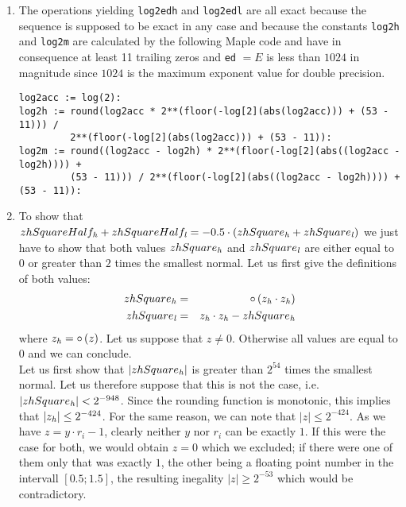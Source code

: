 \begin{enumerate}
\item The operations yielding {\tt log2edh} and {\tt log2edl} are all exact because the \Add~ sequence is supposed 
to be exact in any case and because the constants {\tt log2h} and {\tt log2m} are calculated by the following Maple
code and have in consequence at least 11 trailing zeros and {\tt ed} $=E$ is less than $1024$ in magnitude since $1024$ is
the maximum exponent value for double precision. 
\begin{lstlisting}[caption={Maple code for computing {\tt log2h} and {\tt log2m}},firstnumber=21,label={list:maplelog2}]
log2acc := log(2):
log2h := round(log2acc * 2**(floor(-log[2](abs(log2acc))) + (53 - 11))) / 
         2**(floor(-log[2](abs(log2acc))) + (53 - 11)):
log2m := round((log2acc - log2h) * 2**(floor(-log[2](abs((log2acc - log2h)))) + 
         (53 - 11))) / 2**(floor(-log[2](abs((log2acc - log2h)))) + (53 - 11)):
\end{lstlisting}
\item To show that $zhSquareHalf_{\mathit{h}} + zhSquareHalf_{\mathit{l}} = -0.5 \cdot \left( zhSquare_{\mathit{h}} + zhSquare_{\mathit{l}} \right)$ we just have to show
that both values $zhSquare_{\mathit{h}}$ and $zhSquare_{\mathit{l}}$ are either equal to $0$ or greater than $2$ times the smallest
normal. Let us first give the definitions of both values:
\begin{eqnarray*}
zhSquare_{\mathit{h}} & = & \circ \left( z_{\mathit{h}} \cdot z_{\mathit{h}} \right) \\
zhSquare_{\mathit{l}} & = & z_{\mathit{h}} \cdot z_{\mathit{h}} - zhSquare_{\mathit{h}} 
\end{eqnarray*}
where $z_{\mathit{h}} = \circ \left( z \right)$.
Let us suppose that $z \not = 0$. Otherwise all values are equal to $0$ and we can conclude.\\
Let us first show that $\left \vert zhSquare_{\mathit{h}} \right \vert$ is greater than $2^{54}$ times the smallest normal. 
Let us therefore suppose that this
is not the case, i.e. $\left \vert zhSquare_{\mathit{h}} \right \vert < 2^{-948}$. Since the rounding function is monotonic,
this implies that $\left \vert z_{\mathit{h}} \right \vert \leq 2^{-424}$. For the same reason, we can note that 
$\left \vert z \right \vert \leq 2^{-424}$. As we have $z = y \cdot r_i - 1$, clearly neither $y$ nor $r_i$ can be exactly $1$. 
If this were the case for both, we would obtain $z=0$ which we excluded; if there were one of them only that was
exactly $1$, the other being a floating point number in the intervall $\left[ 0.5; 1.5 \right]$, 
the resulting inegality $\left \vert z \right \vert \geq 2^{-53}$ which would be contradictory.\\

\end{enumerate}
